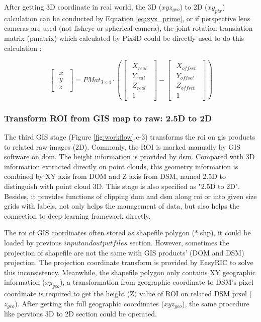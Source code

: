 \documentclass{configs/bmcart}
\begin{document}
After getting 3D coordinate in real world, the 3D ($xyz_{geo}$) to 2D ($xy_{pix}$) calculation can be conducted by Equation \ref{eq:xyz_prime}, or if perspective lens cameras are used (not fisheye or spherical camera), the joint rotation-translation matrix (pmatrix) which calculated by Pix4D could be directly used to do this calculation \cite{pix4d_support_what_2020}:

$$
\begin{bmatrix}\begin{matrix} x \\ y \\ z\end{matrix}\end{bmatrix}
= PMat_{3\times4} \cdot 
\left(\begin{bmatrix}\begin{matrix} 
  X_{real} \\ Y_{real} \\ Z_{real} \\ 1
\end{matrix}\end{bmatrix} 
- 
\begin{bmatrix}\begin{matrix} 
  X_{offset} \\ Y_{offset} \\ Z_{offset} \\ 1
\end{matrix}\end{bmatrix}
\right)
$$

\subsubsection*{Transform ROI from GIS map to raw: 2.5D to 2D}
The third GIS stage (Figure \ref{fig:workflow}.c-3) transforms the \acrfull*{roi} on \acrfull*{gis} products to related raw images (2D). Commonly, the ROI is marked manually by GIS software on \acrfull*{dom}. The height information is provided by \acrfull*{dsm}. Compared with 3D information extracted directly on point clouds, this geometry information is combined by XY axis from DOM and Z axis from DSM, named 2.5D to distinguish with point cloud 3D. This stage is also specified as "2.5D to 2D". Besides, it provides functions of clipping \acrshort*{dom} and \acrshort*{dsm} along \acrshort*{roi} or into given size grids with labels, not only helps the management of data, but also helps the connection to deep learning framework directly.

The \acrfull*{roi} of GIS coordinates often stored as shapefile polygon (*.shp), it could be loaded by previous $input and output files$ section. However, sometimes the projection of shapefile are not the same with GIS products' (DOM and DSM) projection. The projection coordinate transform is provided by EasyRIC to solve this inconsistency. Meanwhile, the shapefile polygon only contains XY geographic information ($xy_{geo}$), a transformation from geographic coordinate to DSM's pixel coordinate is required to get the height (Z) value of ROI on related DSM pixel ($z_{geo}$). After getting the full geographic coordinates ($xyz_{geo}$), the same procedure like pervious 3D to 2D section could be operated.
\end{document}
